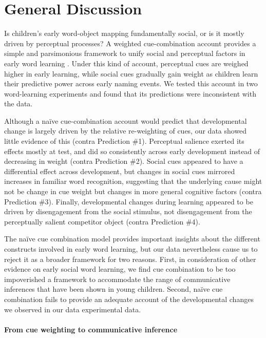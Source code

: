 \documentclass[man,floatsintext]{apa6}
\begin{document}
\section{General Discussion}

Is children's early word-object mapping fundamentally social, or is it mostly driven by perceptual processes? A weighted cue-combination account provides a simple and parsimonious framework to unify social and perceptual factors in early word learning \cite{Hollich2000,Yu2007b,Frank2013a}. Under this kind of account, perceptual cues are weighed higher in early learning, while social cues gradually gain weight as children learn their predictive power across early naming events. We tested this account in two word-learning experiments and found that its predictions were inconsistent with the data. 

Although a na\"{i}ve cue-combination account would predict that developmental change is largely driven by the relative re-weighting of cues, our data showed little evidence of this (contra Prediction \#1). Perceptual salience exerted its effects mostly at test, and did so consistently across early development instead of decreasing in weight (contra Prediction \#2). Social cues appeared to have a differential effect across development, but changes in social cues mirrored increases in familiar word recognition, suggesting that the underlying cause might not be change in cue weight but changes in more general cognitive factors (contra Prediction \#3). Finally, developmental changes during learning appeared to be driven by disengagement from the social stimulus, not disengagement from the perceptually salient competitor object (contra Prediction \#4). 

The  na\"{i}ve cue combination model provides important insights about the different constructs involved in early word learning, but our data nevertheless cause us to reject it as a broader framework for two reasons. First, in consideration of other evidence on early social word learning, we find cue combination to be too impoverished a framework to accommodate the range of communicative inferences that have been shown in young children. Second, na\"{i}ve cue combination fails to provide an adequate account of the developmental changes we observed in our data experimental data.

\paragraph{From cue weighting to communicative inference}
\end{document}
